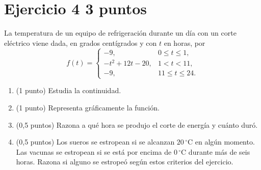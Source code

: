 \documentclass[11pt]{article}
\begin{document}
\section*{Ejercicio 4 \hfill 3 puntos}
La temperatura de un equipo de refrigeración durante un día con un corte eléctrico viene dada, en grados centígrados y con $t$ en horas, por
\[f(t)=\begin{cases}-9,&0\leq t\leq1,\\-t^2+12t-20,&1<t<11,\\-9,&11\leq t\leq24.\end{cases}\]
\begin{enumerate}[label=(\alph*)]
\item (1 punto) Estudia la continuidad.
\item (1 punto) Representa gráficamente la función.
\item (0,5 puntos) Razona a qué hora se produjo el corte de energía y cuánto duró.
\item (0,5 puntos) Los sueros se estropean si se alcanzan $20\,^{\circ}\mathrm C$ en algún momento. Las vacunas se estropean si se está por encima de $0\,^{\circ}\mathrm C$ durante más de seis horas. Razona si alguno se estropeó según estos criterios del ejercicio.
\end{enumerate}
\end{document}
